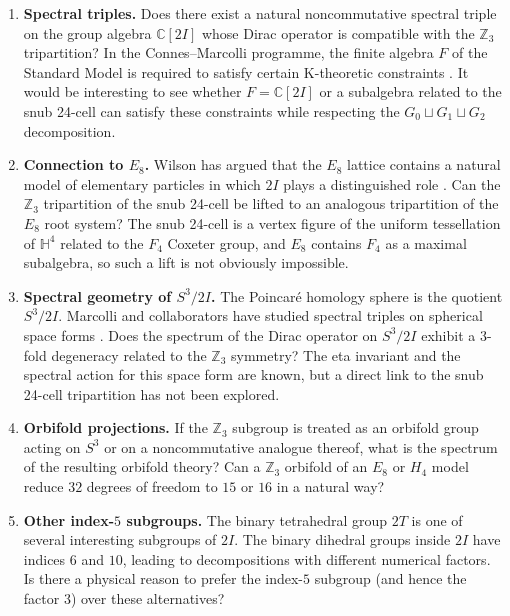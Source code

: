 \documentclass[10pt,reqno]{amsart}
\theoremstyle{plain}
\theoremstyle{definition}
\begin{document}
\begin{enumerate}
\item[1.] \textbf{Spectral triples.} Does there exist a natural noncommutative spectral triple on the group algebra $\mathbb{C}[2I]$ whose Dirac operator is compatible with the $\mathbb{Z}_3$ tripartition? In the Connes--Marcolli programme, the finite algebra $F$ of the Standard Model is required to satisfy certain K-theoretic constraints \cite{ConnesMarcolli2008,Chamseddine2025}. It would be interesting to see whether $F = \mathbb{C}[2I]$ or a subalgebra related to the snub 24-cell can satisfy these constraints while respecting the $G_0 \sqcup G_1 \sqcup G_2$ decomposition.

\item \textbf{Connection to $E_8$.} Wilson has argued that the $E_8$ lattice contains a natural model of elementary particles in which $2I$ plays a distinguished role \cite{Wilson2024}. Can the $\mathbb{Z}_3$ tripartition of the snub 24-cell be lifted to an analogous tripartition of the $E_8$ root system? The snub 24-cell is a vertex figure of the uniform tessellation of $\mathbb{H}^4$ related to the $F_4$ Coxeter group, and $E_8$ contains $F_4$ as a maximal subalgebra, so such a lift is not obviously impossible.

\item \textbf{Spectral geometry of $S^3/2I$.} The Poincar\'{e} homology sphere is the quotient $S^3/2I$. Marcolli and collaborators have studied spectral triples on spherical space forms \cite{ConnesMarcolli2008,Marcolli2015}. Does the spectrum of the Dirac operator on $S^3/2I$ exhibit a $3$-fold degeneracy related to the $\mathbb{Z}_3$ symmetry? The eta invariant and the spectral action for this space form are known, but a direct link to the snub 24-cell tripartition has not been explored.

\item \textbf{Orbifold projections.} If the $\mathbb{Z}_3$ subgroup is treated as an orbifold group acting on $S^3$ or on a noncommutative analogue thereof, what is the spectrum of the resulting orbifold theory? Can a $\mathbb{Z}_3$ orbifold of an $E_8$ or $H_4$ model reduce $32$ degrees of freedom to $15$ or $16$ in a natural way?

\item \textbf{Other index-$5$ subgroups.} The binary tetrahedral group $2T$ is one of several interesting subgroups of $2I$. The binary dihedral groups inside $2I$ have indices $6$ and $10$, leading to decompositions with different numerical factors. Is there a physical reason to prefer the index-$5$ subgroup (and hence the factor $3$) over these alternatives?


\end{enumerate}
\end{document}
